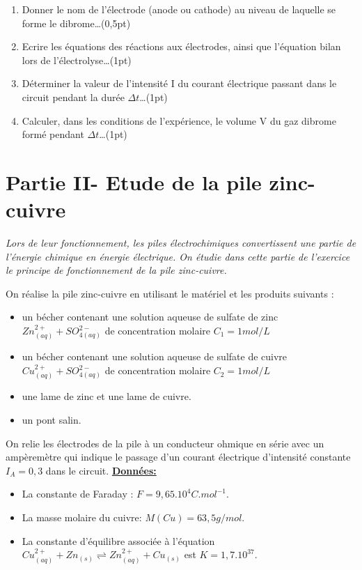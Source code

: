 \documentclass[12pt]{article}
\begin{document}
\begin{enumerate}
  \item Donner le nom de l’électrode (anode ou cathode) au niveau de laquelle se forme le dibrome\dots(0,5pt)
  \item Ecrire les équations des réactions aux électrodes, ainsi que l’équation bilan lors de
    l’électrolyse\dots(1pt)
\item Déterminer la valeur de l’intensité I du courant électrique passant dans le circuit pendant la
  durée $\Delta{t}$\dots(1pt)
\item Calculer, dans les conditions de l’expérience, le volume V du gaz dibrome formé pendant $\Delta{t}$\dots(1pt)
\end{enumerate}


 \section*{Partie II- Etude de la pile zinc-cuivre}
\emph{Lors de leur fonctionnement, les piles électrochimiques convertissent une partie de l’énergie
chimique en énergie électrique. On étudie dans cette partie de l’exercice le principe de
fonctionnement de la pile zinc-cuivre.}

On réalise la pile zinc-cuivre en utilisant le matériel et les produits suivants :
\begin{itemize}
  \item un bécher contenant une solution aqueuse de sulfate de zinc $Zn^{2+}_{(aq)} + SO^{2-}_{4(aq)}$ de concentration
molaire $C_1 =1 mol/L$

\item un bécher contenant une solution aqueuse de sulfate de cuivre $Cu^{2+}_{(aq)} + SO^{2-}_{4(aq)}$ de concentration
molaire $C_2 = 1mol/L$
\item une lame de zinc et une lame de cuivre.
\item un pont salin.
\end{itemize}
On relie les électrodes de la pile à un conducteur ohmique en série avec un ampèremètre qui
indique le passage d’un courant électrique d’intensité constante $I_A = 0,3$ dans le circuit.
\textbf{\underline{Données:}}
\begin{itemize}
  \item La constante de Faraday : $F=9,65.10^{4} C.mol^{-1} $.
  \item La masse molaire du cuivre: $M(Cu) = 63,5 g/mol$.
  \item La constante d'équilibre associée à l'équation $Cu^{2+}_{(aq)} + Zn_{(s)} \rightleftharpoons	
 Zn^{2+}_{(aq)} + Cu_{(s)} $ est $K =1,7.10^{37}$.
\end{itemize}
\end{document}
